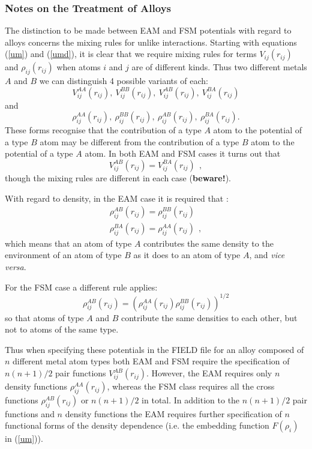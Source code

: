 \subsubsection*{Notes on the Treatment of Alloys}
\label{comment_on_alloys}
The distinction to be made between EAM and FSM potentials with regard to
alloys concerns the mixing rules for unlike interactions.  Starting with
equations (\ref{um}) and (\ref{umd}), it is clear that we require mixing
rules for terms $V_{ij}(r_{ij})$ and $\rho_{ij}(r_{ij})$ when atoms $i$
and $j$ are of different kinds.  Thus two different metals $A$ and $B$ we
can distinguish 4 possible variants of each:
\[V^{AA}_{ij}(r_{ij}),~V^{BB}_{ij}(r_{ij}),~V^{AB}_{ij}(r_{ij}),
~V^{BA}_{ij}(r_{ij})\]
and
\[\rho^{AA}_{ij}(r_{ij}),~\rho^{BB}_{ij}(r_{ij}),~\rho^{AB}_{ij}(r_{ij}),
~\rho^{BA}_{ij}(r_{ij}).\]
These forms recognise that the contribution of a type $A$ atom to
the potential of a type $B$ atom may be different from the
contribution of a type $B$ atom to the potential of a type $A$ atom.
 In both EAM \cite{johnson-89a} and FSM \cite{rafii-tabar-91a} cases it
turns out that
\begin{equation}
V^{AB}_{ij}(r_{ij})=V^{BA}_{ij}(r_{ij})~~,
\end{equation}
though the mixing rules are different in each case ({\bf beware!}). 

With regard to density, in the EAM case it is required that 
\cite{johnson-89a}:
\begin{eqnarray}
\rho^{AB}_{ij}(r_{ij})=\rho^{BB}_{ij}(r_{ij}) \nonumber \\
\rho^{BA}_{ij}(r_{ij})=\rho^{AA}_{ij}(r_{ij})~~,
\end{eqnarray}
which means that an atom of type $A$ contributes the same density to
the environment of an atom of type $B$ as it does to an atom of type
$A$, and {\em vice versa}.

For the FSM case \cite{rafii-tabar-91a} a different rule applies:
\begin{equation}
\rho^{AB}_{ij}(r_{ij})=(\rho^{AA}_{ij}(r_{ij})\rho^{BB}_{ij}(r_{ij}))^{1/2}
\end{equation}
so that atoms of type $A$ and $B$ contribute the same densities to
each other, but not to atoms of the same type.

Thus when specifying these potentials in the \D{} FIELD file for
an alloy composed of $n$ different metal atom types both EAM and FSM
require the specification of $n(n+1)/2$ pair functions
$V^{AB}_{ij}(r_{ij})$.  However, the EAM requires only $n$ density
functions $\rho^{AA}_{ij}(r_{ij})$, whereas the FSM class requires all
the cross functions $\rho^{AB}_{ij}(r_{ij})$ or $n(n+1)/2$ in total.
In addition to the $n(n+1)/2$ pair functions and $n$ density functions
the EAM requires further specification of $n$ functional forms of the
density dependence (i.e. the embedding function $F(\rho_i)$ in (\ref{um})).

